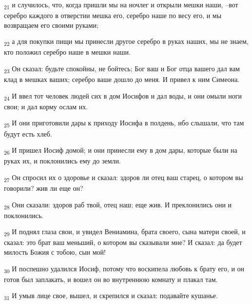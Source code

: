 \begin{tcolorbox}
\textsubscript{21} и случилось, что, когда пришли мы на ночлег и открыли мешки наши, --вот серебро каждого в отверстии мешка его, серебро наше по весу его, и мы возвращаем его своими руками;
\end{tcolorbox}
\begin{tcolorbox}
\textsubscript{22} а для покупки пищи мы принесли другое серебро в руках наших, мы не знаем, кто положил серебро наше в мешки наши.
\end{tcolorbox}
\begin{tcolorbox}
\textsubscript{23} Он сказал: будьте спокойны, не бойтесь; Бог ваш и Бог отца вашего дал вам клад в мешках ваших; серебро ваше дошло до меня. И привел к ним Симеона.
\end{tcolorbox}
\begin{tcolorbox}
\textsubscript{24} И ввел тот человек людей сих в дом Иосифов и дал воды, и они омыли ноги свои; и дал корму ослам их.
\end{tcolorbox}
\begin{tcolorbox}
\textsubscript{25} И они приготовили дары к приходу Иосифа в полдень, ибо слышали, что там будут есть хлеб.
\end{tcolorbox}
\begin{tcolorbox}
\textsubscript{26} И пришел Иосиф домой; и они принесли ему в дом дары, которые были на руках их, и поклонились ему до земли.
\end{tcolorbox}
\begin{tcolorbox}
\textsubscript{27} Он спросил их о здоровье и сказал: здоров ли отец ваш старец, о котором вы говорили? жив ли еще он?
\end{tcolorbox}
\begin{tcolorbox}
\textsubscript{28} Они сказали: здоров раб твой, отец наш; еще жив. И преклонились они и поклонились.
\end{tcolorbox}
\begin{tcolorbox}
\textsubscript{29} И поднял глаза свои, и увидел Вениамина, брата своего, сына матери своей, и сказал: это брат ваш меньший, о котором вы сказывали мне? И сказал: да будет милость Божия с тобою, сын мой!
\end{tcolorbox}
\begin{tcolorbox}
\textsubscript{30} И поспешно удалился Иосиф, потому что воскипела любовь к брату его, и он готов был заплакать, и вошел он во внутреннюю комнату и плакал там.
\end{tcolorbox}
\begin{tcolorbox}
\textsubscript{31} И умыв лице свое, вышел, и скрепился и сказал: подавайте кушанье.
\end{tcolorbox}
